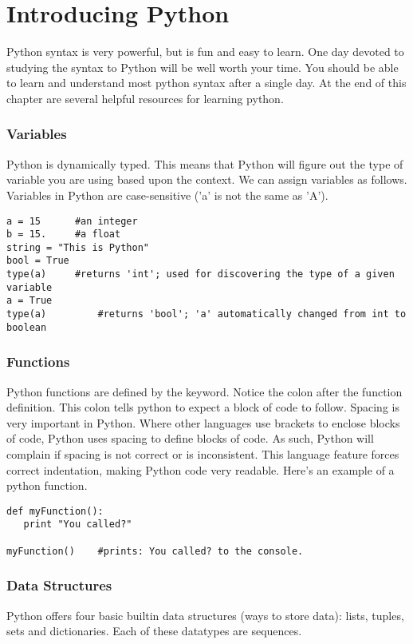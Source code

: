 \section*{Introducing Python}
Python syntax is very powerful, but is fun and easy to learn.  One day devoted to studying the syntax to Python will be well worth your time.  You should be able to learn and understand most python syntax after a single day.  At the end of this chapter are several helpful resources for learning python.

\subsubsection*{Variables}
Python is dynamically typed.  This means that Python will figure out the type of variable you are using based upon the context.  We can assign variables as follows.  Variables in Python are case-sensitive ('a' is not the same as 'A').
\begin{lstlisting}[style=python]
a = 15		#an integer
b = 15.		#a float
string = "This is Python"
bool = True
type(a)		#returns 'int'; used for discovering the type of a given variable
a = True
type(a)         #returns 'bool'; 'a' automatically changed from int to boolean
\end{lstlisting}

\subsubsection*{Functions}
Python functions are defined by the  keyword.  Notice the colon after the function definition.  This colon tells python to expect a block of code to follow.  Spacing is very important in Python.  Where other languages use brackets to enclose blocks of code, Python uses spacing to define blocks of code.  As such, Python will complain if spacing is not correct or is inconsistent.  This language feature forces correct indentation, making Python code very readable.  Here's an example of a python function.
\begin{lstlisting}[style=python]
def myFunction():
   print "You called?"

myFunction()	#prints: You called? to the console.
\end{lstlisting}

\subsubsection*{Data Structures}
Python offers four basic builtin data structures (ways to store data): lists, tuples, sets and dictionaries.  Each of these datatypes are sequences.  
